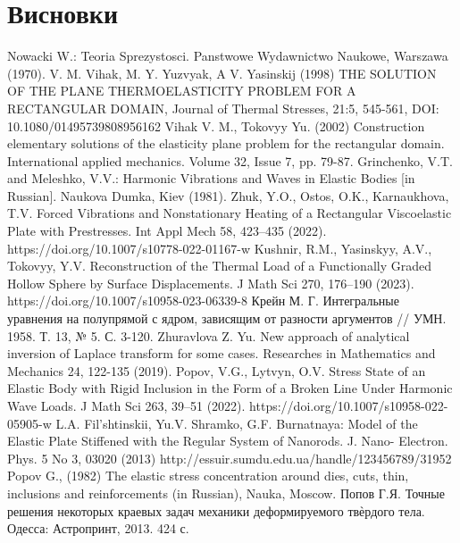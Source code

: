 \documentclass[a4paper,14pt]{extarticle}
\numberwithin{equation}{section}
\begin{document}
\section*{\centering Висновки}

\newpage

\begin{thebibliography}{1}
    Nowacki W.: Teoria Sprezystosci. Panstwowe Wydawnictwo Naukowe, Warszawa (1970).
    V. M. Vihak, M. Y. Yuzvyak, A V. Yasinskij (1998) THE SOLUTION OF THE PLANE THERMOELASTICITY PROBLEM FOR A RECTANGULAR DOMAIN, Journal of Thermal Stresses, 21:5, 545-561, DOI: 10.1080/01495739808956162
    Vihak V. M., Tokovyy Yu. (2002) Construction elementary solutions of the elasticity plane problem for the rectangular domain. International applied mechanics. Volume 32, Issue 7, pp. 79-87.
    Grinchenko, V.T. and Meleshko, V.V.: Harmonic Vibrations and Waves in Elastic Bodies [in Russian]. Naukova Dumka, Kiev (1981).
    Zhuk, Y.O., Ostos, O.K., Karnaukhova, T.V. Forced Vibrations and Nonstationary Heating of a Rectangular Viscoelastic Plate with Prestresses. Int Appl Mech 58, 423–435 (2022). https://doi.org/10.1007/s10778-022-01167-w
    Kushnir, R.M., Yasinskyy, A.V., Tokovyy, Y.V. Reconstruction of the Thermal Load of a Functionally Graded Hollow Sphere by Surface Displacements. J Math Sci 270, 176–190 (2023). https://doi.org/10.1007/s10958-023-06339-8
    Крейн М. Г. Интегральные уравнения на полупрямой с ядром, зависящим от разности аргументов // УМН. 1958. Т. 13, № 5. С. 3-120.
    Zhuravlova Z. Yu. New approach of analytical inversion of Laplace transform for some cases. Researches in Mathematics and Mechanics 24, 122-135 (2019).
    Popov, V.G., Lytvyn, O.V. Stress State of an Elastic Body with Rigid Inclusion in the Form of a Broken Line Under Harmonic Wave Loads. J Math Sci 263, 39–51 (2022). https://doi.org/10.1007/s10958-022-05905-w
    L.A. Fil’shtinskii, Yu.V. Shramko, G.F. Burnatnaya: Model of the Elastic Plate Stiffened with the Regular System of Nanorods. J. Nano- Electron. Phys. 5 No 3, 03020 (2013) http://essuir.sumdu.edu.ua/handle/123456789/31952
    Popov G., (1982) The elastic stress concentration around dies, cuts, thin, inclusions and reinforcements (in Russian), Nauka, Moscow.
    Попов Г.Я. Точные решения некоторых краевых задач механики деформируемого твѐрдого тела. Одесса: Астропринт, 2013. 424 с.

\end{thebibliography}
\end{document}
